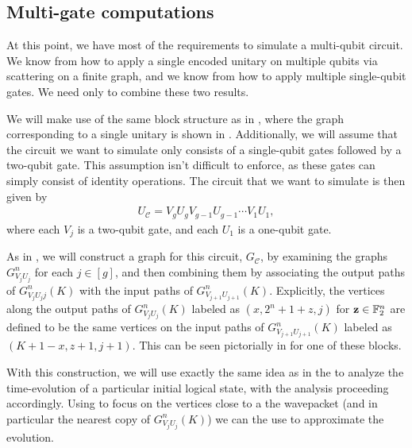 \documentclass[../thesis-main/thesis-main]{subfiles}
\begin{document}

\subsection{Multi-gate computations}


At this point, we have most of the requirements to simulate a multi-qubit circuit.  We know from  how to apply a single encoded unitary on multiple qubits via scattering on a finite graph, and we know from  how to apply multiple single-qubit gates.  We need only to combine these two results.

We will make use of the same block structure as in , where the graph corresponding to a single unitary is shown in .  Additionally, we will assume that the circuit we want to simulate only consists of a single-qubit gates followed by a two-qubit gate.  This assumption isn't difficult to enforce, as these gates can simply consist of identity operations.  The circuit that we want to simulate is then given by
\begin{align}
  {U}_{\mathcal{C}} = V_{g} U_g V_{g-1} U_{g-1} \cdots V_{1} U_1,
\end{align}
where each $V_j$ is a two-qubit gate, and each $U_1$ is a one-qubit gate.

As in , we will construct a graph for this circuit, $G_{\mathcal{C}}$, by examining the graphs $G_{V_jU_j}^{n}$ for each $j\in [g]$, and then combining them by associating the output paths of $G_{V_jU_jj}^{n}(K)$ with the input paths of $G_{V_{j+1}U_{j+1}}^{n}(K)$.  Explicitly, the vertices along the output paths of $G_{V_jU_j}^{n}(K)$ labeled as $(x,2^{n} + 1 +z, j)$ for $\mathbf{z}\in \mathbb{F}_2^n$ are defined to be the same vertices on the input paths of $G_{V_{j+1}U_{j+1}}^{n}(K)$ labeled as $(K+1-x,z+1,j+1)$.  This can be seen pictorially in  for one of these blocks.


  
With this construction, we will use exactly the same idea as in the  to analyze the time-evolution of a particular initial logical state, with the analysis proceeding accordingly.  Using  to focus on the vertices close to a the wavepacket (and in particular the nearest copy of $G_{V_jU_j}^{n}(K)$) we can the use  to approximate the evolution.
 
\end{document}
